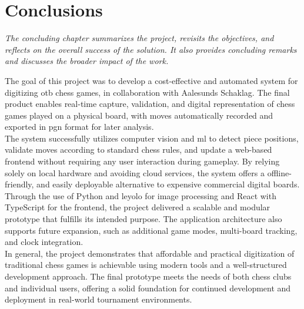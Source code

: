 \chapter{Conclusions}

\begin{center}
    \textit{The concluding chapter summarizes the project, revisits the objectives, and reflects on the overall success of the solution. It also provides concluding remarks and discusses the broader impact of the work.}
\end{center}

The goal of this project was to develop a cost-effective and automated system for digitizing \gls{otb} chess games, in collaboration with Aalesunds Schaklag. The final product enables real-time capture, validation, and digital representation of chess games played on a physical board, with moves automatically recorded and exported in \gls{pgn} format for later analysis. \\

The system successfully utilizes computer vision and \gls{ml} to detect piece positions, validate moves according to standard chess rules, and update a web-based frontend without requiring any user interaction during gameplay. By relying solely on local hardware and avoiding cloud services, the system offers a offline-friendly, and easily deployable alternative to expensive commercial digital boards. \\

Through the use of Python and \gls{leyolo} for image processing and React with TypeScript for the frontend, the project delivered a scalable and modular prototype that fulfills its intended purpose. The application architecture also supports future expansion, such as additional game modes, multi-board tracking, and clock integration. \\

In general, the project demonstrates that affordable and practical digitization of traditional chess games is achievable using modern tools and a well-structured development approach. The final prototype meets the needs of both chess clubs and individual users, offering a solid foundation for continued development and deployment in real-world tournament environments.
